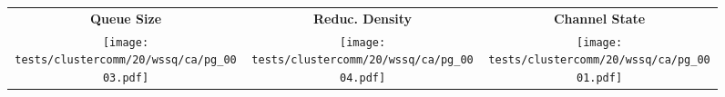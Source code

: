 \begin{slide}
    \begin{figure}
        \begin{table}[t]
            \centering
            \begin{tabular}{@{}ccc}
                 \multicolumn{1}{c|}{\textbf{Queue Size}} &
                 \multicolumn{1}{c|}{\textbf{Reduc. Density}} &
                 \multicolumn{1}{c}{\textbf{Channel State}} \\ \cline{1-3}
            \multicolumn{1}{|c|}{\texttt{[image: tests/clustercomm/20/wssq/ca/pg\_0003.pdf]}} & 
            \multicolumn{1}{c|}{\texttt{[image: tests/clustercomm/20/wssq/ca/pg\_0004.pdf]}} & 
            \multicolumn{1}{c|}{\texttt{[image: tests/clustercomm/20/wssq/ca/pg\_0001.pdf]}} \\ 
            \cline{1-3}
            \end{tabular}
        \end{table}
    \end{figure}

\end{slide}

